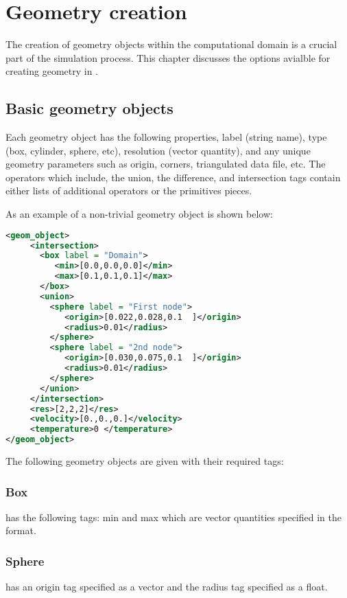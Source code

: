 \chapter{Geometry creation}\label{chap:GeometryCreation}
The creation of geometry objects within the computational domain is
a crucial part of the simulation process.  This chapter discusses the
options avialble for creating geometry in \Vaango.

\section{Basic geometry objects} \label{Sec:GeometryObjects}


Each geometry object has the following properties, label (string
name), type (box, cylinder, sphere, etc), resolution (vector
quantity), and any unique geometry parameters such as origin, corners,
triangulated data file, etc.  The operators which include, the union,
the difference, and intersection tags contain either lists of
additional operators or the primitives pieces.

As an example of a non-trivial geometry object is shown below:

\begin{lstlisting}[language=XML]
<geom_object>
     <intersection>
       <box label = "Domain">
          <min>[0.0,0.0,0.0]</min>
          <max>[0.1,0.1,0.1]</max>
       </box>
       <union>
         <sphere label = "First node">
            <origin>[0.022,0.028,0.1  ]</origin>
            <radius>0.01</radius>
         </sphere>
         <sphere label = "2nd node">
            <origin>[0.030,0.075,0.1  ]</origin>
            <radius>0.01</radius>
         </sphere>
       </union>
     </intersection>
     <res>[2,2,2]</res>
     <velocity>[0.,0.,0.]</velocity>
     <temperature>0 </temperature>
</geom_object>
\end{lstlisting}

The following geometry objects are given with their required tags:

\subsection{Box}
 has the following tags: min and max which are
vector quantities specified in the \Textsfc{[a, b, c]} format.

\subsection{Sphere}
 has an origin tag specified as a vector and the
radius tag specified as a float.

